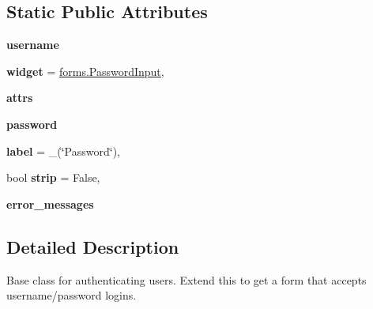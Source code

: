 \subsection*{Static Public Attributes}
\begin{DoxyCompactItemize}
\item 
\mbox{\label{classdjango_1_1contrib_1_1auth_1_1forms_1_1_authentication_form_a0d82cc6a2da1383311ae30ef03034393}} 
{\bfseries username}
\item 
\mbox{\label{classdjango_1_1contrib_1_1auth_1_1forms_1_1_authentication_form_a228b00981d9a497983ea40a161a38d5d}} 
{\bfseries widget} = \mbox{\hyperlink{classdjango_1_1forms_1_1widgets_1_1_password_input}{forms.\+Password\+Input}},
\item 
\mbox{\label{classdjango_1_1contrib_1_1auth_1_1forms_1_1_authentication_form_afce4b38b7a05cf85904bc51f4b862c9e}} 
{\bfseries attrs}
\item 
\mbox{\label{classdjango_1_1contrib_1_1auth_1_1forms_1_1_authentication_form_a6b89c8880c4b5b477e11a656e302648f}} 
{\bfseries password}
\item 
\mbox{\label{classdjango_1_1contrib_1_1auth_1_1forms_1_1_authentication_form_a35c9cb682a9788196bf9795032fbb42f}} 
{\bfseries label} = \+\_\+(\char`\"{}Password\char`\"{}),
\item 
\mbox{\label{classdjango_1_1contrib_1_1auth_1_1forms_1_1_authentication_form_a84aafa3b8182cd8717ed3d11b11aa4bf}} 
bool {\bfseries strip} = False,
\item 
\mbox{\label{classdjango_1_1contrib_1_1auth_1_1forms_1_1_authentication_form_abf25a285aaee2b91e874879b28513272}} 
{\bfseries error\+\_\+messages}
\end{DoxyCompactItemize}


\subsection{Detailed Description}
\begin{DoxyVerb}Base class for authenticating users. Extend this to get a form that accepts
username/password logins.
\end{DoxyVerb}
 

